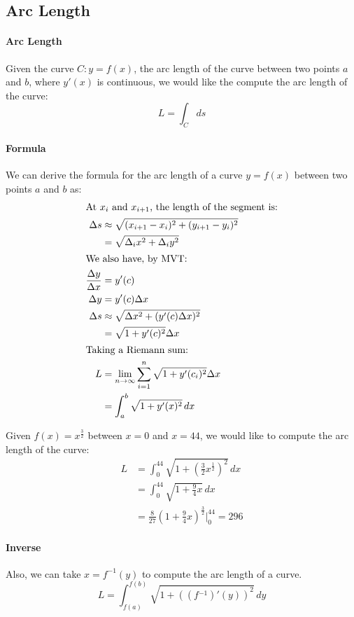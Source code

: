 \documentclass[11pt]{article}
\begin{document}
\subsection{Arc Length}
\paragraph{Arc Length}
    Given the curve $C: y = f(x)$, the arc length of the curve between two points $a$ and $b$, where $y'(x)$ is continuous, we would like the compute the arc length of the curve:
    $$ L = \int_C ds$$
\paragraph{Formula} We can derive the formula for the arc length of a curve $y = f(x)$ between two points $a$ and $b$ as:
\begin{align}
    \intertext{At $x_i$ and $x_{i+1}$, the length of the segment is:}
    \Delta s &\approx \sqrt{(x_{i+1} - x_i)^2 + (y_{i+1} - y_i)^2} \nonumber \\
            &= \sqrt{\Delta_i x^2 + \Delta_i y^2} \nonumber \\
    \intertext{We also have, by MVT:}
    \frac{\Delta y}{\Delta x} &= y'(c) \nonumber \\
    \Delta y &= y'(c) \Delta x \nonumber \\
    \Delta s &\approx \sqrt{\Delta x^2 + (y'(c) \Delta x)^2} \nonumber \\
            &= \sqrt{1 + y'(c)^2} \Delta x \nonumber \\
    \intertext{Taking a Riemann sum:}
    L &= \lim_{n \to \infty} \sum_{i=1}^n \sqrt{1 + y'(c_i)^2} \Delta x \nonumber \\
    &= \int_a^b \sqrt{1 + y'(x)^2} \, dx 
\end{align}
\begin{example}
    Given $f(x) = x^\frac{3}{2}$ between $x = 0$ and $x = 44$, we would like to compute the arc length of the curve:
    \begin{align*}
        L &= \int_0^{44} \sqrt{1 + \left(\frac{3}{2}x^{\frac{1}{2}}\right)^2} \, dx \\
        &= \int_0^{44} \sqrt{1 + \frac{9}{4}x} \, dx \\
        &= \frac{8}{27} \left(1 + \frac{9}{4}x\right)^{\frac{3}{2}} \Big|_0^{44} = 296
    \end{align*}
\end{example}
\paragraph{Inverse} Also, we can take $x = f^{-1}(y)$ to compute the arc length of a curve.
\begin{equation}
    L = \int_{f(a)}^{f(b)} \sqrt{1 + ((f{^{-1}})'(y))^2} \, dy
\end{equation}
\end{document}
